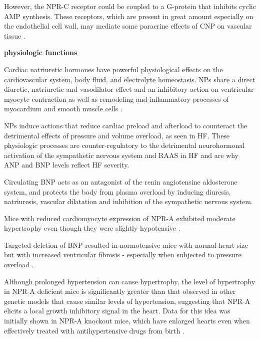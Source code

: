 \documentclass[14pt,a4paper,onecolumn]{extarticle}
\begin{document}
However, the NPR-C receptor could be coupled to a G-protein that inhibits cyclic AMP synthesis. These receptors, which are present in great amount especially on the endothelial cell wall, may mediate some paracrine effects of CNP on vascular tissue \citep{bib355}.

\textbf{physiologic functions}

Cardiac natriuretic hormones have powerful physiological effects on the cardiovascular system, body fluid, and electrolyte homeostasis. NPs share a direct diuretic, natriuretic and vasodilator effect and an inhibitory action on ventricular myocyte contraction as well as remodeling and inflammatory processes of myocardium and smooth muscle cells \citep{bib35}.

NPs induce actions that reduce cardiac preload and afterload to counteract the detrimental effects of pressure and volume overload, as seen in HF.  These physiologic processes are counter-regulatory to the detrimental neurohormonal activation of the sympathetic nervous system and RAAS in HF and are why ANP and BNP levels reflect HF severity. \citep{Potter2011} %

Circulating BNP acts as an antagonist of the renin angiotensine aldosterone system, and protects the body from plasma overload by inducing diuresis, natriuresis, vascular dilatation and inhibition of the sympathetic nervous system. \citep{Hall2005}


Mice with reduced cardiomyocyte expression of NPR-A exhibited moderate hypertrophy even though they were slightly hypotensive %
\citep{Patel2005}.

Targeted deletion of BNP resulted in normotensive mice with normal heart size but with increased ventricular fibrosis - especially when subjected to pressure overload \citep{Tamura2000}.

Although prolonged hypertension can cause hypertrophy, the level of hypertrophy in NPR-A deficient mice is significantly greater than that observed in other genetic models that cause similar levels of hypertension, suggesting that NPR-A elicits a local growth inhibitory signal in the heart. Data for this idea was initially shown in NPR-A knockout mice, which have enlarged hearts even when effectively treated with antihypertensive drugs from birth \citep{Knowles2001}.
\end{document}
